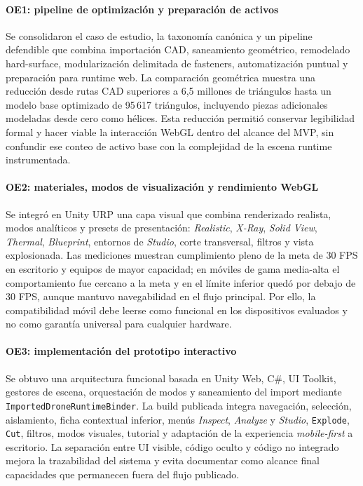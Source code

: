 \paragraph{OE1: pipeline de optimización y preparación de activos} Se consolidaron el caso de estudio, la taxonomía canónica y un pipeline defendible que combina importación CAD, saneamiento geométrico, remodelado hard-surface, modularización delimitada de fasteners, automatización puntual y preparación para runtime web. La comparación geométrica muestra una reducción desde rutas CAD superiores a 6,5 millones de triángulos hasta un modelo base optimizado de 95\,617 triángulos, incluyendo piezas adicionales modeladas desde cero como hélices. Esta reducción permitió conservar legibilidad formal y hacer viable la interacción WebGL dentro del alcance del MVP, sin confundir ese conteo de activo base con la complejidad de la escena runtime instrumentada.

\paragraph{OE2: materiales, modos de visualización y rendimiento WebGL} Se integró en Unity URP una capa visual que combina renderizado realista, modos analíticos y presets de presentación: \textit{Realistic}, \textit{X-Ray}, \textit{Solid View}, \textit{Thermal}, \textit{Blueprint}, entornos de \textit{Studio}, corte transversal, filtros y vista explosionada. Las mediciones muestran cumplimiento pleno de la meta de 30 FPS en escritorio y equipos de mayor capacidad; en móviles de gama media-alta el comportamiento fue cercano a la meta y en el límite inferior quedó por debajo de 30 FPS, aunque mantuvo navegabilidad en el flujo principal. Por ello, la compatibilidad móvil debe leerse como funcional en los dispositivos evaluados y no como garantía universal para cualquier hardware.

\paragraph{OE3: implementación del prototipo interactivo} Se obtuvo una arquitectura funcional basada en Unity Web, C\#, UI Toolkit, gestores de escena, orquestación de modos y saneamiento del import mediante \texttt{ImportedDroneRuntimeBinder}. La build publicada integra navegación, selección, aislamiento, ficha contextual inferior, menús \textit{Inspect}, \textit{Analyze} y \textit{Studio}, \texttt{Explode}, \texttt{Cut}, filtros, modos visuales, tutorial y adaptación de la experiencia \textit{mobile-first} a escritorio. La separación entre UI visible, código oculto y código no integrado mejora la trazabilidad del sistema y evita documentar como alcance final capacidades que permanecen fuera del flujo publicado.

